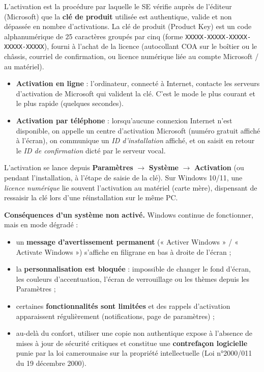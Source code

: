 \documentclass[11pt]{article}
\newcommand{\cle}[1]{{\popxbold\color{popdark}#1}}
\begin{document}
\begin{definition}
L'\cle{activation} est la procédure par laquelle le SE vérifie auprès de l'éditeur (Microsoft) que la \textbf{clé de produit} utilisée est authentique, valide et non dépassée en nombre d'activations. La \cle{clé de produit} (Product Key) est un code alphanumérique de 25 caractères groupés par cinq (forme \texttt{XXXXX-XXXXX-XXXXX-XXXXX-XXXXX}), fourni à l'achat de la licence (autocollant COA sur le boîtier ou le châssis, courriel de confirmation, ou licence numérique liée au compte Microsoft / au matériel).
\end{definition}

\begin{propriete}
\begin{itemize}
  \item \textbf{Activation en ligne} : l'ordinateur, connecté à Internet, contacte les serveurs d'activation de Microsoft qui valident la clé. C'est le mode le plus courant et le plus rapide (quelques secondes).
  \item \textbf{Activation par téléphone} : lorsqu'aucune connexion Internet n'est disponible, on appelle un centre d'activation Microsoft (numéro gratuit affiché à l'écran), on communique un \emph{ID d'installation} affiché, et on saisit en retour le \emph{ID de confirmation} dicté par le serveur vocal.
\end{itemize}
L'activation se lance depuis \textbf{Paramètres} $\rightarrow$ \textbf{Système} $\rightarrow$ \textbf{Activation} (ou pendant l'installation, à l'étape de saisie de la clé). Sur Windows 10/11, une \emph{licence numérique} lie souvent l'activation au matériel (carte mère), dispensant de ressaisir la clé lors d'une réinstallation sur le même PC.
\end{propriete}

\textbf{Conséquences d'un système non activé.} Windows continue de fonctionner, mais en mode dégradé :

\begin{itemize}
  \item un \textbf{message d'avertissement permanent} (« Activer Windows » / « Activate Windows ») s'affiche en filigrane en bas à droite de l'écran ;
  \item la \textbf{personnalisation est bloquée} : impossible de changer le fond d'écran, les couleurs d'accentuation, l'écran de verrouillage ou les thèmes depuis les Paramètres ;
  \item certaines \textbf{fonctionnalités sont limitées} et des rappels d'activation apparaissent régulièrement (notifications, page de paramètres) ;
  \item au-delà du confort, utiliser une copie non authentique expose à l'absence de mises à jour de sécurité critiques et constitue une \textbf{contrefaçon logicielle} punie par la loi camerounaise sur la propriété intellectuelle (Loi n°2000/011 du 19 décembre 2000).
\end{itemize}
\end{document}
